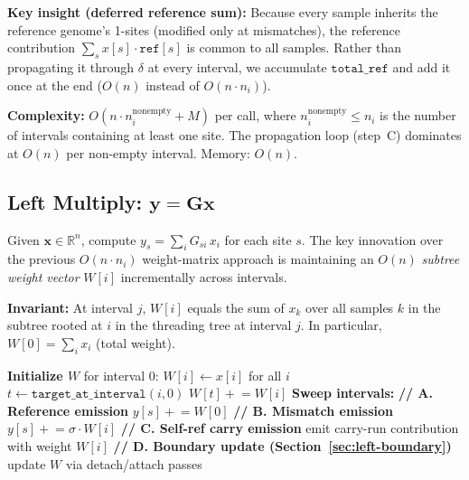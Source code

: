 \documentclass[11pt]{article}
\begin{document}
\textbf{Key insight (deferred reference sum):}  Because every sample
inherits the reference genome's 1-sites (modified only at mismatches), the
reference contribution $\sum_s x[s] \cdot \texttt{ref}[s]$ is common to
all samples.  Rather than propagating it through $\delta$ at every
interval, we accumulate $\texttt{total\_ref}$ and add it once at the end
($O(n)$ instead of $O(n \cdot n_i)$).

\textbf{Complexity:} $O(n \cdot n_i^\text{nonempty} + M)$ per call, where
$n_i^\text{nonempty} \le n_i$ is the number of intervals containing at
least one site.  The propagation loop (step~C) dominates at
$O(n)$ per non-empty interval.  Memory: $O(n)$.

\subsection{Left Multiply: $\mathbf{y} = \mathbf{G} \mathbf{x}$}
\label{sec:left-multiply}

Given $\mathbf{x} \in \mathbb{R}^n$, compute $y_s = \sum_i G_{si} \,
x_i$ for each site $s$.  The key innovation over the previous $O(n \cdot
n_i)$ weight-matrix approach is maintaining an $O(n)$ \emph{subtree weight
vector} $W[i]$ incrementally across intervals.

\textbf{Invariant:} At interval $j$, $W[i]$ equals the sum of $x_k$ over
all samples $k$ in the subtree rooted at $i$ in the threading tree at
interval $j$.  In particular, $W[0] = \sum_i x_i$ (total weight).

\begin{algorithm}[h]
\caption{Tree-shuttle left multiply (single-threaded core)}
\begin{algorithmic}[1]
\State \textbf{Initialize $W$} for interval 0:
\State $W[i] \gets x[i]$ for all $i$
    \State $t \gets \texttt{target\_at\_interval}(i, 0)$
     $W[t] \mathrel{+}= W[i]$ \EndIf
\EndFor
\State \textbf{Sweep intervals:}
    \State \textbf{// A. Reference emission}
        \State $y[s] \mathrel{+}= W[0]$
    \EndFor
    \State \textbf{// B. Mismatch emission}
        \State $y[s] \mathrel{+}= \sigma \cdot W[i]$
    \EndFor
    \State \textbf{// C. Self-ref carry emission}
        \State emit carry-run contribution with weight $W[i]$
    \EndFor
    \State \textbf{// D. Boundary update (Section~\ref{sec:left-boundary})}
        \State update $W$ via detach/attach passes
    \EndIf
\EndFor
\end{algorithmic}
\end{algorithm}
\end{document}
